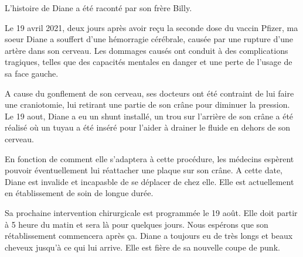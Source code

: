 L'histoire de Diane a été raconté par son frère Billy.

Le 19 avril 2021, deux jours après avoir reçu la seconde dose du vaccin Pfizer,
ma soeur Diane a souffert d'une hémorragie cérébrale, causée par une rupture
d'une artère dans son cerveau. Les dommages causés ont conduit à des
complications tragiques, telles que des capacités mentales en danger et une
perte de l'usage de sa face gauche.

A cause du gonflement de son cerveau, ses docteurs ont été contraint de lui faire
une craniotomie, lui retirant une partie de son crâne pour diminuer la
pression. Le 19 aout, Diane a eu un shunt installé, un trou sur l'arrière de son
crâne a été réalisé où un tuyau a été inséré pour l'aider à drainer le fluide en
dehors de son cerveau.

En fonction de comment elle s'adaptera à cette procédure, les médecins espèrent
pouvoir éventuellement lui réattacher une plaque sur son crâne. A cette date,
Diane est invalide et incapasble de se déplacer de chez elle. Elle est
actuellement en établissement de soin de longue durée.

Sa prochaine intervention chirurgicale est programmée le 19 août. Elle doit
partir à 5 heure du matin et sera là pour quelques jours. Nous espérons que son
rétablissement commencera après ça. Diane a toujours eu de très longs et beaux
cheveux jusqu'à ce qui lui arrive. Elle est fière de sa nouvelle coupe de punk.

